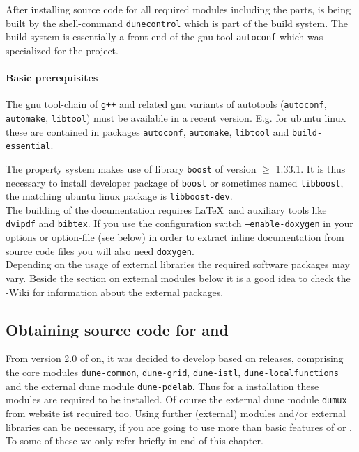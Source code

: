 After installing source code for all required \Dune modules including the \Dumux parts, \Dune is being built by the shell-command \texttt{dunecontrol} which is part of the {\Dune} build system. The {\Dune} build system is essentially a front-end of the gnu tool \texttt{autoconf} which was specialized for the \Dune project.

\paragraph{Basic prerequisites} \label{prerequisites}
The gnu tool-chain of \texttt{g++}  and related gnu variants of autotools
(\texttt{autoconf}, \texttt{automake}, \texttt{libtool}) must be available in a recent version. E.g. for ubuntu linux these are contained in packages \texttt{autoconf}, \texttt{automake}, \texttt{libtool} and \texttt{build-essential}.

%
The \Dumux property system makes use of library \texttt{boost} of version $\geqslant$ 1.33.1.
It is thus necessary to install developer package of \texttt{boost} or sometimes named \texttt{libboost}, the matching ubuntu linux package is \texttt{libboost-dev}. \\

The building of the documentation requires \LaTeX\ and auxiliary tools like \texttt{dvipdf} and \texttt{bibtex}. 
If you use the configuration switch \texttt{--enable-doxygen} in your options or option-file (see below) in order to extract inline documentation from source code files you will also need \texttt{doxygen}.\\

Depending on the usage of external libraries the required software packages may vary. 
Beside the section on external modules below it is a good idea to check the {\Dune}-Wiki \cite{DUNE-MAIN-WIKI} for information about the external packages.

\subsection{Obtaining source code for \Dune and \Dumux}
From version 2.0 of \Dune on, it was decided to develop \Dumux based on \Dune releases, comprising the core modules 
\texttt{dune-common}, \texttt{dune-grid}, \texttt{dune-istl}, \texttt{dune-localfunctions} and the external dune module \texttt{dune-pdelab}. Thus for a \Dumux installation these modules are required to be installed. Of course the external dune module \texttt{dumux} from \Dumux website ist required too. Using further (external) \Dune modules and/or external \Dune libraries can be necessary, if you are going to use more than basic features of \Dune or \Dumux. To some of these we only refer briefly in end of this chapter.\\


